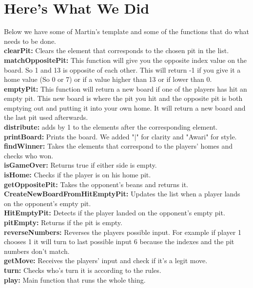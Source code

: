 \documentclass{article}
\begin{document}
    \section{Here's What We Did}
        Below we have some of Martin's template and some of the functions that do what needs to be done.
        \\
        \textbf{clearPit:} Clears the element that corresponds to the chosen pit in the list.
        \\
        \textbf{matchOppositePit:}
        This function will give you the opposite index value on the board. So 1 and 13 is opposite of each other. This will return -1 if you give it a home value (So 0 or 7) or if a value higher than 13 or if lower than 0.
        \\
        \textbf{emptyPit:}
        This function will return a new board if one of the players has hit an empty pit. This new board is where the pit you hit and the opposite pit is both emptying out and putting it into your own home. It will return a new board and the last pit used afterwards.
        \\
        \textbf{distribute:} adds by 1 to the elements after the corresponding element.
        \\
        \textbf{printBoard:} Prints the board. We added "$|$" for clarity and "Awari" for style.
        \\
        \textbf{findWinner:} Takes the elements that correspond to the players' homes and checks who won.
        \\
        \textbf{isGameOver:} Returns true if either side is empty.
        \\
        \textbf{isHome:} Checks if the player is on his home pit.
        \\
        \textbf{getOppositePit:} Takes the opponent's beans and returns it.
        \\
        \textbf{CreateNewBoardFromHitEmptyPit:} Updates the list when a player lands on the opponent's empty pit.
        \\
        \textbf{HitEmptyPit:} Detects if the player landed on the opponent's empty pit.
        \\
        \textbf{pitEmpty:} Returns if the pit is empty.
        \\
        \textbf{reverseNumbers:} Reverses the players possible input. For example if player 1 chooses 1 it will turn to last possible input 6 because the indexes and the pit numbers don't match.
        \\
        \textbf{getMove:} Receives the players' input and check if it's a legit move.
        \\
        \textbf{turn:} Checks who's turn it is according to the rules.
        \\
        \textbf{play:} Main function that runs the whole thing.
        \\
\end{document}

